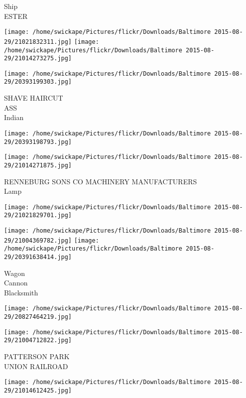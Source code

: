 \documentclass[10pt,letterpaper]{article}
\begin{document}
Ship\\
ESTER\\
\pagebreak

\texttt{[image: /home/swickape/Pictures/flickr/Downloads/Baltimore 2015-08-29/21021832311.jpg]}
\texttt{[image: /home/swickape/Pictures/flickr/Downloads/Baltimore 2015-08-29/21014273275.jpg]}

\texttt{[image: /home/swickape/Pictures/flickr/Downloads/Baltimore 2015-08-29/20393199303.jpg]}

SHAVE HAIRCUT\\
ASS\\
Indian\\
\pagebreak

\texttt{[image: /home/swickape/Pictures/flickr/Downloads/Baltimore 2015-08-29/20393198793.jpg]}

\vspace{0.25in}
\texttt{[image: /home/swickape/Pictures/flickr/Downloads/Baltimore 2015-08-29/21014271875.jpg]}

RENNEBURG SONS CO MACHINERY MANUFACTURERS\\
Lamp\\
\pagebreak

\texttt{[image: /home/swickape/Pictures/flickr/Downloads/Baltimore 2015-08-29/21021829701.jpg]}

\vspace{0.25in}
\texttt{[image: /home/swickape/Pictures/flickr/Downloads/Baltimore 2015-08-29/21004369782.jpg]}
\texttt{[image: /home/swickape/Pictures/flickr/Downloads/Baltimore 2015-08-29/20391638414.jpg]}

Wagon\\
Cannon\\
Blacksmith\\
\pagebreak

\texttt{[image: /home/swickape/Pictures/flickr/Downloads/Baltimore 2015-08-29/20827464219.jpg]}

\vspace{0.25in}
\texttt{[image: /home/swickape/Pictures/flickr/Downloads/Baltimore 2015-08-29/21004712822.jpg]}

PATTERSON PARK\\
UNION RAILROAD\\
\pagebreak

\texttt{[image: /home/swickape/Pictures/flickr/Downloads/Baltimore 2015-08-29/21014612425.jpg]}
\end{document}
